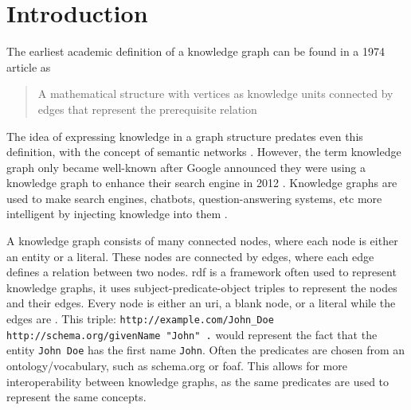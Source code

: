 
\chapter{Introduction}
\label{chapter:introduction}

The earliest academic definition of a knowledge graph can be found in a 1974 article as \begin{quote}
    A mathematical structure with vertices as knowledge units connected by edges that represent the prerequisite relation \citep{Marchi1974,bergman2019common}
\end{quote} 

The idea of expressing knowledge in a graph structure predates even this definition, with the concept of semantic networks \citep{Richens1956PreprogrammingFM}. %
However, the term knowledge graph only became well-known after Google announced they were using a knowledge graph to enhance their search engine in 2012 \citep{singhal2012introducing}. 
Knowledge graphs are used to make search engines, chatbots, question-answering systems, etc more intelligent by injecting knowledge into them \citep{SurveyOnKGs}. 

A knowledge graph consists of many connected nodes, where each node is either an entity or a literal. These nodes are connected by edges, where each edge defines a relation between two nodes. \acrshort{rdf} is a framework often used to represent knowledge graphs, it uses subject-predicate-object triples to represent the nodes and their edges. Every node is either an \acrshort{uri}, a blank node, or a literal while the edges are . This triple: \texttt{http://example.com/John\_Doe http://schema.org/givenName "John" .} would represent the fact that the entity \texttt{John Doe} has the first name \texttt{John}. Often the predicates are chosen from an ontology/vocabulary, such as schema.org or \acrshort{foaf}. This allows for more interoperability between knowledge graphs, as the same predicates are used to represent the same concepts.

